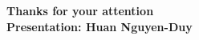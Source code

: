 \documentclass[
	11pt, %
]{beamer}
\begin{document}









\begin{frame}[plain] %
	\begin{center}
		{\Huge \textbf{Thanks for your attention}} \\
		\vspace{30px}
		{\textbf{Presentation: Huan Nguyen-Duy}}
            
	\end{center}
\end{frame}

\end{document}
